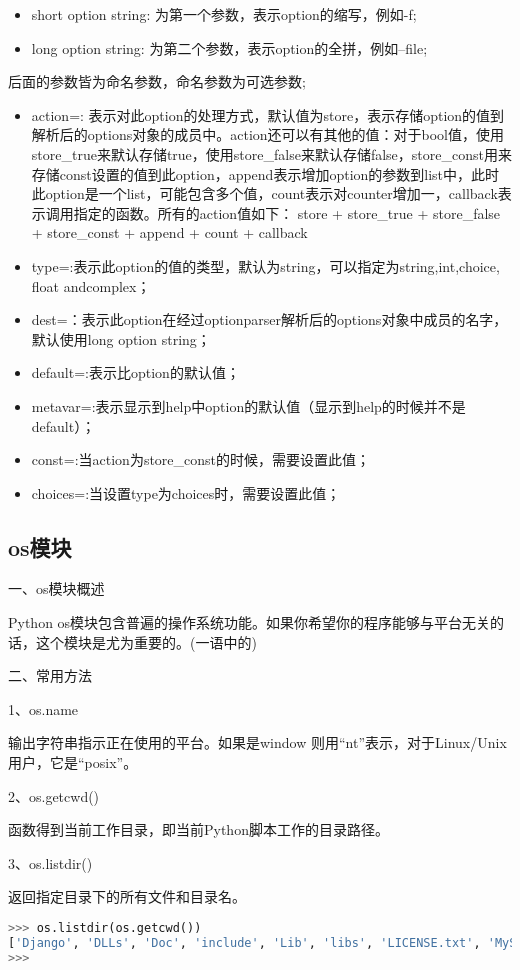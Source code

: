 \begin{itemize}
\item short option string: 为第一个参数，表示option的缩写，例如-f;
\item long option string: 为第二个参数，表示option的全拼，例如--file;
\end{itemize}
后面的参数皆为命名参数，命名参数为可选参数;
\begin{itemize}
\item
action=: 表示对此option的处理方式，默认值为store，表示存储option的值到解析后的options对象的成员中。action还可以有其他的值：对于bool值，使用store\_true来默认存储true，使用store\_false来默认存储false，store\_const用来存储const设置的值到此option，append表示增加option的参数到list中，此时此option是一个list，可能包含多个值，count表示对counter增加一，callback表示调用指定的函数。所有的action值如下：
store + store\_true + store\_false + store\_const + append + count + callback
\item
type=:表示此option的值的类型，默认为string，可以指定为string,int,choice, float andcomplex；
\item 
dest=：表示此option在经过optionparser解析后的options对象中成员的名字，默认使用long option string；
\item 
default=:表示比option的默认值；
\item 
metavar=:表示显示到help中option的默认值（显示到help的时候并不是default）；
\item 
const=:当action为store\_const的时候，需要设置此值；
\item 
choices=:当设置type为choices时，需要设置此值；
\end{itemize}



\subsection{os模块}
一、os模块概述

Python os模块包含普遍的操作系统功能。如果你希望你的程序能够与平台无关的话，这个模块是尤为重要的。(一语中的)

二、常用方法

1、os.name

输出字符串指示正在使用的平台。如果是window 则用“nt”表示，对于Linux/Unix用户，它是“posix”。

2、os.getcwd()

函数得到当前工作目录，即当前Python脚本工作的目录路径。

3、os.listdir()

返回指定目录下的所有文件和目录名。
\begin{lstlisting}[language=Python]
>>> os.listdir(os.getcwd())
['Django', 'DLLs', 'Doc', 'include', 'Lib', 'libs', 'LICENSE.txt', 'MySQL-python-wininst.log', 'NEWS.txt', 'PIL-wininst.log', 'python.exe', 'pythonw.exe', 'README.txt', 'RemoveMySQL-python.exe', 'RemovePIL.exe', 'Removesetuptools.exe', 'Scripts', 'setuptools-wininst.log', 'tcl', 'Tools', 'w9xpopen.exe']
>>> 
\end{lstlisting}

